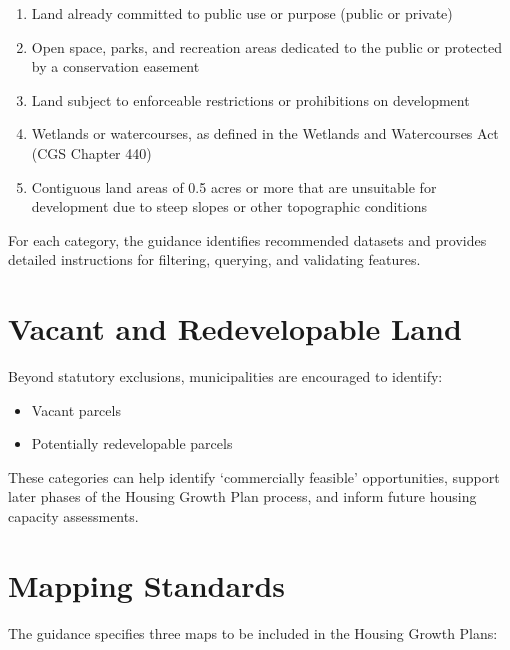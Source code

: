 \documentclass[
  letterpaper,
  DIV=11,
  numbers=noendperiod]{scrreprt}
\providecommand{\tightlist}{%
  \setlength{\itemsep}{0pt}\setlength{\parskip}{0pt}}
\begin{document}
\begin{enumerate}
\def\labelenumi{\Alph{enumi}.}
\tightlist
\item
  Land already committed to public use or purpose (public or private)
\item
  Open space, parks, and recreation areas dedicated to the public or
  protected by a conservation easement
\item
  Land subject to enforceable restrictions or prohibitions on
  development
\item
  Wetlands or watercourses, as defined in the Wetlands and Watercourses
  Act (CGS Chapter 440)
\item
  Contiguous land areas of 0.5 acres or more that are unsuitable for
  development due to steep slopes or other topographic conditions
\end{enumerate}

For each category, the guidance identifies recommended datasets and
provides detailed instructions for filtering, querying, and validating
features.

\section*{Vacant and Redevelopable
Land}\label{vacant-and-redevelopable-land}


Beyond statutory exclusions, municipalities are encouraged to identify:

\begin{itemize}
\item
  Vacant parcels
\item
  Potentially redevelopable parcels
\end{itemize}

These categories can help identify `commercially feasible'
opportunities, support later phases of the Housing Growth Plan process,
and inform future housing capacity assessments.

\section*{Mapping Standards}\label{mapping-standards}


The guidance specifies three maps to be included in the Housing Growth
Plans:
\end{document}
